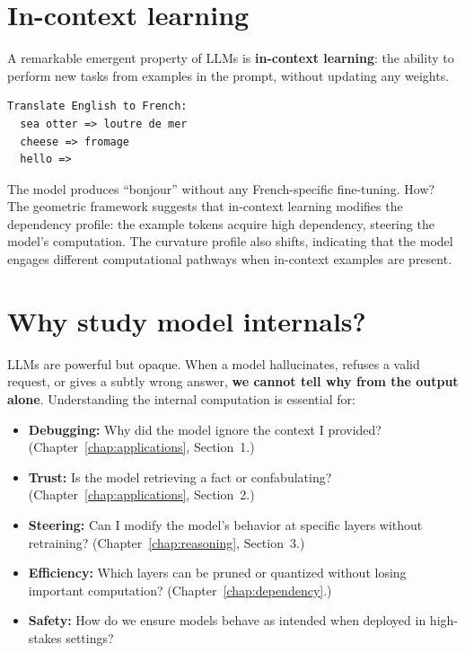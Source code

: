 \documentclass[11pt, twoside, openright]{memoir}
\begin{document}
\section{In-context learning}

A remarkable emergent property of LLMs is \textbf{in-context learning}: the
ability to perform new tasks from examples in the prompt, without updating
any weights.

\begin{lstlisting}[caption={In-context learning: the model infers the task from examples}]
Translate English to French:
  sea otter => loutre de mer
  cheese => fromage
  hello =>
\end{lstlisting}

The model produces ``bonjour'' without any French-specific fine-tuning.  How?
The geometric framework suggests that in-context learning modifies the
dependency profile: the example tokens acquire high dependency, steering the
model's computation.  The curvature profile also shifts, indicating that
the model engages different computational pathways when in-context examples
are present.

\section{Why study model internals?}

LLMs are powerful but opaque.  When a model hallucinates, refuses a valid
request, or gives a subtly wrong answer, \textbf{we cannot tell why from the
output alone}.  Understanding the internal computation is essential for:

\begin{itemize}[nosep]
\item \textbf{Debugging:} Why did the model ignore the context I provided?
  (Chapter~\ref{chap:applications}, Section~1.)
\item \textbf{Trust:} Is the model retrieving a fact or confabulating?
  (Chapter~\ref{chap:applications}, Section~2.)
\item \textbf{Steering:} Can I modify the model's behavior at specific layers
  without retraining?  (Chapter~\ref{chap:reasoning}, Section~3.)
\item \textbf{Efficiency:} Which layers can be pruned or quantized without
  losing important computation?  (Chapter~\ref{chap:dependency}.)
\item \textbf{Safety:} How do we ensure models behave as intended when
  deployed in high-stakes settings?
\end{itemize}
\end{document}
